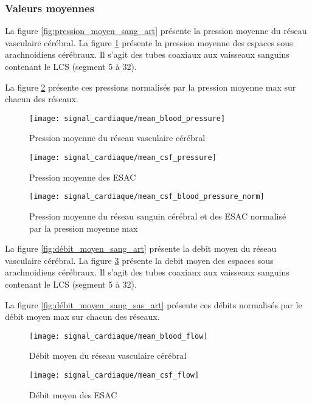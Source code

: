 \documentclass[french]{report}
\begin{document}
\subsubsection{Valeurs moyennes}

La figure \ref{fig:pression_moyen_sang_art} présente la pression moyenne du réseau vasculaire cérébral.
La figure \ref{fig:pression_moyen_sas_art} présente la pression moyenne des espaces sous arachnoidiens cérébraux. Il s'agit des tubes coaxiaux aux vaisseaux sanguins contenant le LCS (segment 5 à 32).

La figure \ref{fig:pression_moyen_sang_sas_art} présente ces pressions normalisés par la pression moyenne max sur chacun des réseaux.

\begin{figure}
  \begin{minipage}{0.5\linewidth}
    \centering
    \texttt{[image: signal\_cardiaque/mean\_blood\_pressure]}
    \caption{Pression moyenne du réseau vasculaire cérébral}
    \label{fig:pression_moyen_sang_art}
  \end{minipage}
  \hspace{0.5cm}
  \begin{minipage}{0.5\linewidth}
    \centering
    \texttt{[image: signal\_cardiaque/mean\_csf\_pressure]}
    \caption{Pression moyenne des ESAC}
    \label{fig:pression_moyen_sas_art}
  \end{minipage}
  
\end{figure}

\begin{figure}
\centering
\texttt{[image: signal\_cardiaque/mean\_csf\_blood\_pressure\_norm]}
\caption{Pression moyenne du réseau sanguin cérébral et des ESAC normalisé par la pression moyenne max}
    \label{fig:pression_moyen_sang_sas_art}
\end{figure}

La figure \ref{fig:débit_moyen_sang_art} présente la debit moyen du réseau vasculaire cérébral.
La figure \ref{fig:débit_moyen_sas_art} présente la debit moyen des espaces sous arachnoidiens cérébraux. Il s'agit des tubes coaxiaux aux vaisseaux sanguins contenant le LCS (segment 5 à 32).

La figure \ref{fig:débit_moyen_sang_sas_art} présente ces débits normalisés par le débit moyen max sur chacun des réseaux.

\begin{figure}
  \begin{minipage}{0.5\linewidth}
    \centering
    \texttt{[image: signal\_cardiaque/mean\_blood\_flow]}
    \caption{Débit moyen du réseau vasculaire cérébral}
    \label{fig:débit_moyen_sang_art}
  \end{minipage}
  \hspace{0.5cm}
  \begin{minipage}{0.5\linewidth}
    \centering
    \texttt{[image: signal\_cardiaque/mean\_csf\_flow]}
    \caption{Débit moyen des ESAC}
    \label{fig:débit_moyen_sas_art}
  \end{minipage}
  
\end{figure}
\end{document}
